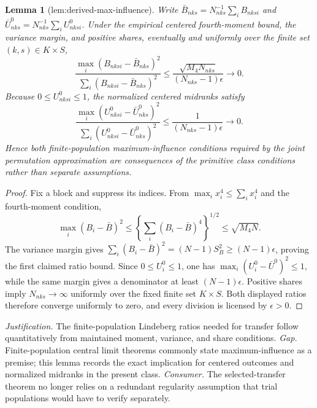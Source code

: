 \documentclass{article}
\newtheorem{lemma}{Lemma}
\begin{document}
\begin{lemma}[lem:derived-max-influence]\label{lem:derived-max-influence}
Write \(\bar B_{nks}=N_{nks}^{-1}\sum_iB_{nksi}\) and \(\bar U^0_{nks}=N_{nks}^{-1}\sum_iU^0_{nksi}\). Under the empirical centered fourth-moment bound, the variance margin, and positive shares, eventually and uniformly over the finite set \((k,s)\in K\times S\), \[\frac{\max_i(B_{nksi}-\bar B_{nks})^2}{\sum_i(B_{nksi}-\bar B_{nks})^2}\le\frac{\sqrt{M_4N_{nks}}}{(N_{nks}-1)\epsilon}\longrightarrow0.\] Because \(0\le U^0_{nksi}\le1\), the normalized centered midranks satisfy \[\frac{\max_i(U^0_{nksi}-\bar U^0_{nks})^2}{\sum_i(U^0_{nksi}-\bar U^0_{nks})^2}\le\frac{1}{(N_{nks}-1)\epsilon}\longrightarrow0.\] Hence both finite-population maximum-influence conditions required by the joint permutation approximation are consequences of the primitive class conditions rather than separate assumptions.
\end{lemma}
\begin{proof}
Fix a block and suppress its indices.  From \(\max_i x_i^4\le\sum_i x_i^4\) and the fourth-moment condition,
\[
\max_i(B_i-\bar B)^2
\le\left\{\sum_i(B_i-\bar B)^4\right\}^{1/2}
\le\sqrt{M_4N}.
\]
The variance margin gives \(\sum_i(B_i-\bar B)^2=(N-1)S_B^2\ge(N-1)\epsilon\), proving the first claimed ratio bound.  Since \(0\le U_i^0\le1\), one has \(\max_i(U_i^0-\bar U^0)^2\le1\), while the same margin gives a denominator at least \((N-1)\epsilon\).  Positive shares imply \(N_{nks}\to\infty\) uniformly over the fixed finite set \(K\times S\).  Both displayed ratios therefore converge uniformly to zero, and every division is licensed by \(\epsilon>0\).
\end{proof}
\par\smallskip\noindent \textit{Justification.} The finite-population Lindeberg ratios needed for transfer follow quantitatively from maintained moment, variance, and share conditions. \textit{Gap.} Finite-population central limit theorems commonly state maximum-influence as a premise; this lemma records the exact implication for centered outcomes and normalized midranks in the present class. \textit{Consumer.} The selected-transfer theorem no longer relies on a redundant regularity assumption that trial populations would have to verify separately.
\end{document}
